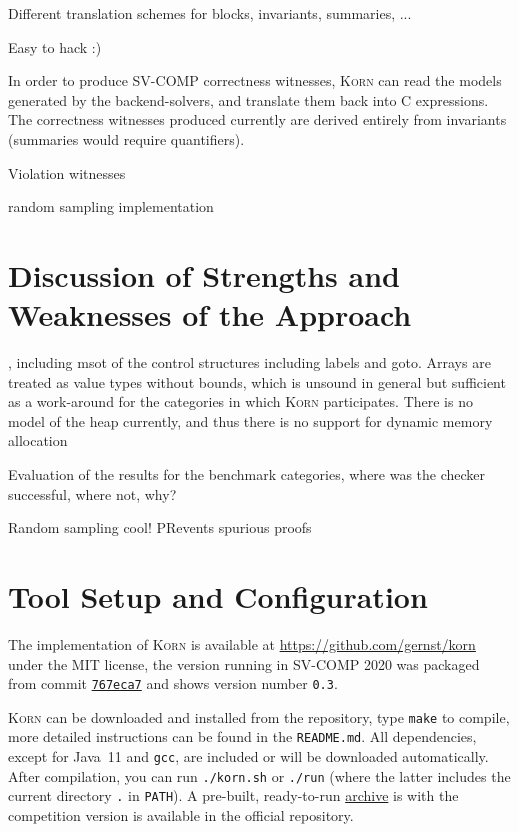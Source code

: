 \documentclass{llncs}
\newcommand{\Korn}{\textsc{Korn}\xspace}
\begin{document}
Different translation schemes for blocks, invariants, summaries, ...

Easy to hack :)

In order to produce SV-COMP correctness witnesses, \Korn can read the models generated by the backend-solvers, and translate them back into C expressions.
The correctness witnesses produced currently are derived entirely from invariants (summaries would require quantifiers).

Violation witnesses 

random sampling implementation

\section{Discussion of Strengths and Weaknesses of the Approach}
\label{sec:discussion}

, including msot of the control structures including labels and goto.
Arrays are treated as value types without bounds, which is unsound in general but sufficient as a work-around for the categories in which \Korn participates.
There is no model of the heap currently, and thus there is no support for dynamic memory allocation

Evaluation of the results for the benchmark categories, where was the checker successful, where not, why?

Random sampling cool! PRevents spurious proofs


\section{Tool Setup and Configuration}
\label{sec:project}

The implementation of \Korn is available at
    \url{https://github.com/gernst/korn} under the MIT license,
the version running in SV-COMP 2020 was packaged from commit
\href{https://github.com/gernst/korn/commit/767eca718edf7f04e995142b679762242c68eef5}{\tt 767eca7}
and shows version number \texttt{0.3}.

\Korn can be downloaded and installed from the repository, type \texttt{make} to compile,
more detailed instructions can be found in the \texttt{README.md}.
All dependencies, except for Java~11 and \texttt{gcc}, are included or will be downloaded automatically.
After compilation, you can run \texttt{./korn.sh} or \texttt{./run}
(where the latter includes the current directory \texttt{.} in \texttt{PATH}).
A pre-built, ready-to-run
\href{https://gitlab.com/gernst/svcomp-archives-2021/-/blob/master/2021/korn.zip}{archive}
is with the competition version is available in the official repository.
\end{document}

